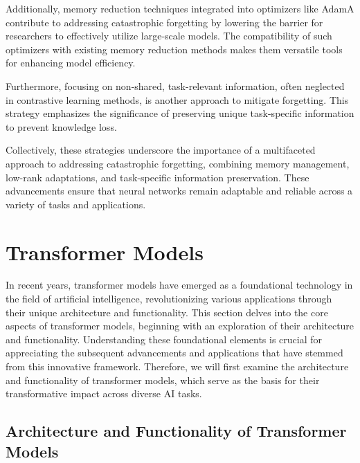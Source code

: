 Additionally, memory reduction techniques integrated into optimizers like AdamA contribute to addressing catastrophic forgetting by lowering the barrier for researchers to effectively utilize large-scale models. The compatibility of such optimizers with existing memory reduction methods makes them versatile tools for enhancing model efficiency.



Furthermore, focusing on non-shared, task-relevant information, often neglected in contrastive learning methods, is another approach to mitigate forgetting. This strategy emphasizes the significance of preserving unique task-specific information to prevent knowledge loss.



Collectively, these strategies underscore the importance of a multifaceted approach to addressing catastrophic forgetting, combining memory management, low-rank adaptations, and task-specific information preservation. These advancements ensure that neural networks remain adaptable and reliable across a variety of tasks and applications.














\section{Transformer Models} \label{sec:Transformer Models}

In recent years, transformer models have emerged as a foundational technology in the field of artificial intelligence, revolutionizing various applications through their unique architecture and functionality. This section delves into the core aspects of transformer models, beginning with an exploration of their architecture and functionality. Understanding these foundational elements is crucial for appreciating the subsequent advancements and applications that have stemmed from this innovative framework. Therefore, we will first examine the architecture and functionality of transformer models, which serve as the basis for their transformative impact across diverse AI tasks.





\subsection{Architecture and Functionality of Transformer Models} \label{subsec:Architecture and Functionality of Transformer Models}

